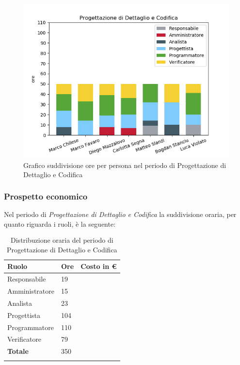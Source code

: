 \begin{figure}[H]
	\centering
	\includegraphics[width=1\linewidth]{./images/fig_pdc.png}
	\caption{Grafico suddivisione ore per persona nel periodo di Progettazione di Dettaglio e Codifica}
	\label{fig:grafico suddivione ruoli periodo pdc}
\end{figure}

\subsubsection{Prospetto economico}

Nel periodo di \textit{Progettazione di Dettaglio e Codifica} la suddivisione oraria, per quanto riguarda i ruoli, è la seguente: 

\begin{longtable}{| C{.30\textwidth}| C{.15\textwidth}| C{.20\textwidth}|}
	\hline
	\textbf{Ruolo} & \textbf{Ore} & \textbf{Costo in \euro} \\
	\hline 
	Responsabile & 19 &  \\
	\hline
	Amministratore & 15 & \\
	\hline
	Analista & 23 &  \\
	\hline
	Progettista & 104 &  \\
	\hline
	Programmatore & 110 &  \\
	\hline
	Verificatore & 79 &  \\
	\hline
	\textbf{Totale} & 350 & \\ 
	\hline
	
	\caption{Distribuzione oraria del periodo di Progettazione di Dettaglio e Codifica}
	\label{Distribuzione oraria pdc}
\end{longtable}

